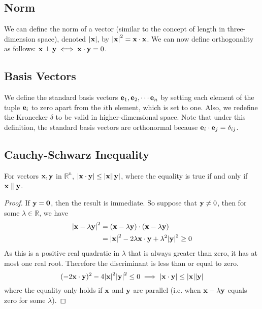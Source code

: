 \documentclass{article}
\begin{document}
\subsection{Norm}
We can define the norm of a vector (similar to the concept of length in three-dimension space), denoted $\abs {\vb x}$, by $\abs{\vb x}^2 = \vb x \cdot \vb x$. We can now define orthogonality as follows: $\vb x \perp \vb y \iff \vb x \cdot \vb y = 0$.

\subsection{Basis Vectors}
We define the standard basis vectors $\vb e_1, \vb e_2, \cdots \vb e_n$ by setting each element of the tuple $\vb e_i$ to zero apart from the $i$th element, which is set to one. Also, we redefine the Kronecker $\delta$ to be valid in higher-dimensional space. Note that under this definition, the standard basis vectors are orthonormal because $\vb e_i \cdot \vb e_j = \delta_{ij}$.

\subsection{Cauchy-Schwarz Inequality}
\begin{proposition}
    For vectors $\vb x, \vb y$ in $\mathbb R^n$, $\abs{\vb x \cdot \vb y} \leq \abs{\vb x} \abs{\vb y}$, where the equality is true if and only if $\vb x \parallel \vb y$.
\end{proposition}
\begin{proof}
    If $\vb y = \vb 0$, then the result is immediate. So suppose that $\vb y \neq 0$, then for some $\lambda \in \mathbb R$, we have
    \begin{align*}
        \abs{\vb x - \lambda \vb y}^2 & =
        (\vb x - \lambda \vb y) \cdot (\vb x - \lambda \vb y)                                                          \\
                                      & = \abs{\vb x}^2 - 2 \lambda \vb x \cdot \vb y + \lambda^2 \abs{\vb y}^2 \geq 0
    \end{align*}
    As this is a positive real quadratic in $\lambda$ that is always greater than zero, it has at most one real root. Therefore the discriminant is less than or equal to zero.
    \[ (-2 \vb x \cdot \vb y)^2 - 4 \abs{\vb x}^2\abs{\vb y}^2 \leq 0
        \implies \abs{\vb x \cdot \vb y} \leq \abs{\vb x}\abs{\vb y} \]
    where the equality only holds if $\vb x$ and $\vb y$ are parallel (i.e. when $\vb x - \lambda \vb y$ equals zero for some $\lambda$).
\end{proof}
\end{document}

